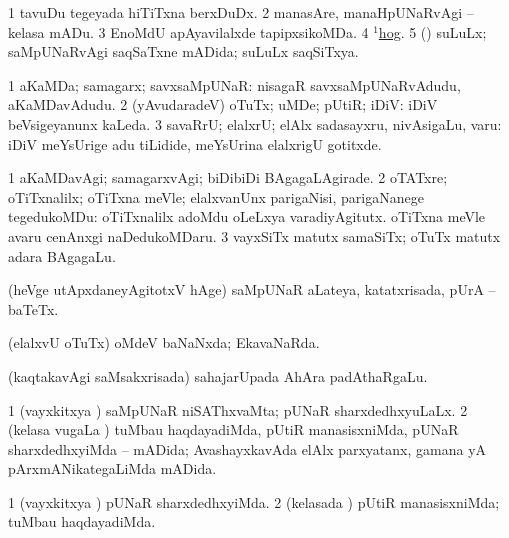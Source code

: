 \noindent 
\gl{\pagu}
\bmng
\bnum
\num{1}  tavuDu tegeyada hiTiTxna berxDuDx. 
\num{2}  manasAre, manaHpUNaRvAgi -- kelasa mADu. 
\num{3}  EnoMdU apAyavilalxde tapipxsikoMDa. 
\num{4}  \hyperref{kandict_h.pdf}{H}{hog(1) nuga(1)}{$^1$hog}. 
\num{5}  (\ame) suLuLx; saMpUNaRvAgi saqSaTxne mADida; suLuLx saqSiTxya. 
\enum
\emng
\eentry

\bentry
{} 
\gl{\nA}
\expl{}
\bmng
\bnum
\num{1} aKaMDa; samagarx; savxsaMpUNaR:  nisagaR savxsaMpUNaRvAdudu, aKaMDavAdudu. 
\num{2} (yAvudaradeV) oTuTx; uMDe; pUtiR; iDiV:  iDiV beVsigeyanunx kaLeda. 
\num{3} savaRrU; elalxrU; elAlx sadasayxru, nivAsigaLu, \mo varu:  iDiV meYsUrige adu tiLidide, meYsUrina elalxrigU gotitxde. 
\enum
\emng

\noindent
\gl{\pagu}
\expl{}
\bmng
\bnum
\num{1}  aKaMDavAgi; samagarxvAgi; biDibiDi BAgagaLAgirade. 
\num{2}  oTATxre; oTiTxnalilx; oTiTxna meVle; elalxvanUnx parigaNisi, parigaNanege tegedukoMDu:  oTiTxnalilx adoMdu oLeLxya varadiyAgitutx.  oTiTxna meVle avaru cenAnxgi naDedukoMDaru. 
\num{3}  vayxSiTx matutx samaSiTx; oTuTx matutx adara BAgagaLu. 
\enum
\emng
\eentry

\bentry
{}
\gl{\nA}
\bmng
(heVge utApxdaneyAgitotxV hAge) saMpUNaR aLateya, katatxrisada, pUrA -- baTeTx. 
\emng
\eentry

\bentry
{}
\gl{\gu}
\bmng
(elalxvU oTuTx) oMdeV baNaNxda; EkavaNaRda. 
\emng
\eentry

\bentry
{} 
\gl{\nA}
\expl{}
\bmng
(kaqtakavAgi saMsakxrisada) sahajarUpada AhAra padAthaRgaLu. 
\emng
\eentry

\bentry
{}
\gl{\gu}
\bmng
\bnum
\num{1} (vayxkitxya \vi) saMpUNaR niSAThxvaMta; pUNaR sharxdedhxyuLaLx. 
\num{2} (kelasa \mo vugaLa \vi) tuMbau haqdayadiMda, pUtiR manasisxniMda, pUNaR sharxdedhxyiMda -- mADida; AvashayxkavAda elAlx parxyatanx, gamana yA pArxmANikategaLiMda mADida. 
\enum
\emng
\eentry

\bentry
{}
\gl{\kirxvi}
\bmng
\bnum
\num{1} (vayxkitxya \vi) pUNaR sharxdedhxyiMda. 
\num{2} (kelasada \vi) pUtiR manasisxniMda; tuMbau haqdayadiMda. 
\enum
\emng
\eentry

